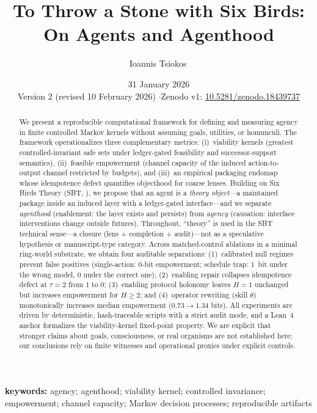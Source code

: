 \documentclass[11pt]{article}
\title{To Throw a Stone with Six Birds: On Agents and Agenthood}
\author{Ioannis Tsiokos\,\orcidlink{0009-0009-7659-5964}}
\affiliation{}
\date{31 January 2026\\[4pt]{\small Version 2 (revised 10 February 2026) \quad$\cdot$\quad Zenodo v1: \href{https://doi.org/10.5281/zenodo.18439737}{10.5281/zenodo.18439737}}}
\makeatletter
\newcommand{\printaffiliation}{\begin{center}\small \@affiliation\end{center}}
\makeatother
\begin{document}
\maketitle
\thispagestyle{firstpage}
\printaffiliation

\begin{abstract}
We present a reproducible computational framework for defining and measuring agency in finite controlled Markov kernels without assuming goals, utilities, or homunculi. The framework operationalizes three complementary metrics: (i)~viability kernels (greatest controlled-invariant safe sets under ledger-gated feasibility and successor-support semantics), (ii)~feasible empowerment (channel capacity of the induced action-to-output channel restricted by budgets), and (iii)~an empirical packaging endomap whose idempotence defect quantifies objecthood for coarse lenses. Building on Six Birds Theory (SBT, \citep{six_birds_theory}), we propose that an agent is a \emph{theory object}---a maintained package inside an induced layer with a ledger-gated interface---and we separate \emph{agenthood} (enablement: the layer exists and persists) from \emph{agency} (causation: interface interventions change outside futures). Throughout, ``theory'' is used in the SBT technical sense---a closure (lens + completion + audit)---not as a speculative hypothesis or manuscript-type category. Across matched-control ablations in a minimal ring-world substrate, we obtain four auditable separations: (1)~calibrated null regimes prevent false positives (single-action: 0-bit empowerment; schedule trap: 1~bit under the wrong model, 0 under the correct one); (2)~enabling repair collapses idempotence defect at $\tau=2$ from 1 to 0; (3)~enabling protocol holonomy leaves $H=1$ unchanged but increases empowerment for $H\ge2$; and (4)~operator rewriting (skill $\theta$) monotonically increases median empowerment ($0.73\to1.34$ bits). All experiments are driven by deterministic, hash-traceable scripts with a strict audit mode, and a Lean~4 anchor formalizes the viability-kernel fixed-point property. We are explicit that stronger claims about goals, consciousness, or real organisms are not established here; our conclusions rely on finite witnesses and operational proxies under explicit controls.
\end{abstract}
\noindent\textbf{keywords:} agency; agenthood; viability kernel; controlled invariance; empowerment; channel capacity; Markov decision processes; reproducible artifacts
\end{document}
